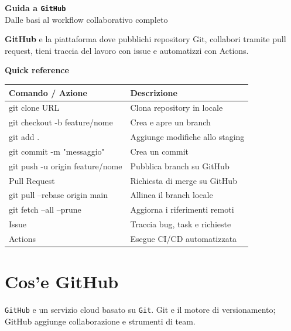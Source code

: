 \documentclass[a4paper,11pt]{article}
\begin{document}
\vspace*{1.5cm}

{\Huge\bfseries\color{MainColor} Guida a \texttt{GitHub}} \\[0.4cm]
{\Large\color{AccentColor} Dalle basi al workflow collaborativo completo}

\vspace{1cm}

\begin{infobox}
\textbf{GitHub} e la piattaforma dove pubblichi repository Git, collabori tramite pull request, tieni traccia del lavoro con issue e automatizzi con Actions.
\end{infobox}

\vspace{0.5cm}

\begin{codebox}
\textbf{Quick reference}

\renewcommand{\arraystretch}{1.2}
\begin{tabularx}{\textwidth}{>{\ttfamily}l X}
\toprule
Comando / Azione & Descrizione \\
\midrule
git clone URL & Clona repository in locale \\
git checkout -b feature/nome & Crea e apre un branch \\
git add . & Aggiunge modifiche allo staging \\
git commit -m "messaggio" & Crea un commit \\
git push -u origin feature/nome & Pubblica branch su GitHub \\
Pull Request & Richiesta di merge su GitHub \\
git pull --rebase origin main & Allinea il branch locale \\
git fetch --all --prune & Aggiorna i riferimenti remoti \\
Issue & Traccia bug, task e richieste \\
Actions & Esegue CI/CD automatizzata \\
\bottomrule
\end{tabularx}
\end{codebox}

\vspace{0.6cm}
\tableofcontents
\newpage

\section{Cos'e GitHub}
\texttt{GitHub} e un servizio cloud basato su \texttt{Git}. Git e il motore di versionamento; GitHub aggiunge collaborazione e strumenti di team.
\end{document}
